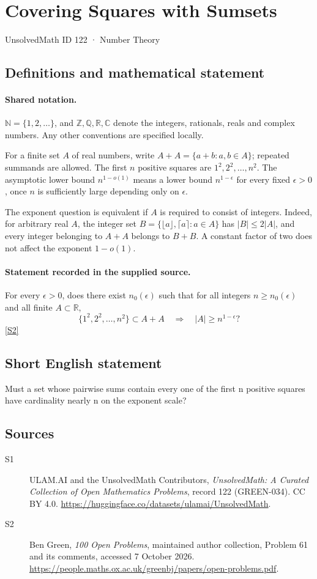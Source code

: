 \documentclass[11pt]{article}
\newcommand{\sref}[2]{\hyperlink{source:#1:#2}{[S#2]}}
\begin{document}
\setcounter{section}{121}
\section{Covering Squares with Sumsets}\label{122}
{\small\sffamily UnsolvedMath ID 122 · Number Theory}
\subsection{Definitions and mathematical statement}

\paragraph{Shared notation.}$\mathbb N=\{1,2,\ldots\}$, and $\mathbb Z,\mathbb Q,\mathbb R,\mathbb C$ denote the integers, rationals, reals and complex numbers. Any other conventions are specified locally.


For a finite set $A$ of real numbers, write $A+A=\{a+b:a,b\in A\}$; repeated summands are allowed. The first $n$ positive squares are $1^2,2^2,\ldots,n^2$. The asymptotic lower bound $n^{1-o(1)}$ means a lower bound $n^{1-\epsilon}$ for every fixed $\epsilon>0$, once $n$ is sufficiently large depending only on $\epsilon$.

The exponent question is equivalent if $A$ is required to consist of integers. Indeed, for arbitrary real $A$, the integer set $B=\{\lfloor a\rfloor,\lceil a\rceil:a\in A\}$ has $|B|\leq2|A|$, and every integer belonging to $A+A$ belongs to $B+B$. A constant factor of two does not affect the exponent $1-o(1)$.
\paragraph{Statement recorded in the supplied source.}
For every $\epsilon>0$, does there exist $n_0(\epsilon)$ such that for all integers $n\geq n_0(\epsilon)$ and all finite $A\subset\mathbb R$,
\[
 \{1^2,2^2,\ldots,n^2\}\subset A+A
 \quad\Longrightarrow\quad |A|\geq n^{1-\epsilon}?
\] \sref{122}{2}
\subsection{Short English statement}
Must a set whose pairwise sums contain every one of the first n positive squares have cardinality nearly n on the exponent scale?
\subsection{Sources}
\begin{description}
\item[\hypertarget{source:122:1}{S1}] ULAM.AI and the UnsolvedMath Contributors, \emph{UnsolvedMath: A Curated Collection of Open Mathematics Problems}, record 122 (GREEN-034). CC BY 4.0. \url{https://huggingface.co/datasets/ulamai/UnsolvedMath}.
\item[\hypertarget{source:122:2}{S2}] Ben Green, \emph{100 Open Problems}, maintained author collection, Problem 61 and its comments, accessed 7 October 2026. \url{https://people.maths.ox.ac.uk/greenbj/papers/open-problems.pdf}.
\end{description}
\label{end:122}
\end{document}

